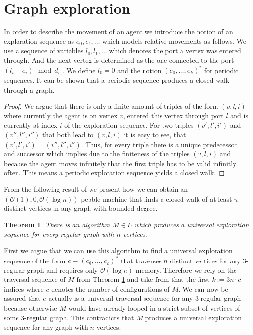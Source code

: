 \documentclass[draft,oneside]{scrartcl}
\newtheorem{thm}{Theorem}
\begin{document}
\section{Graph exploration}
In order to describe the movement of an agent we introduce the notion of an
exploration sequence as $e_{0}, e_{1},\dots$ which models relative movements
as follows. We use a sequence of variables $l_{0},l_{1},\dots$ which denotes
the port a vertex was entered through. And the next vertex is determined as the
one connected to the port $(l_{i} + e_{i}) \mod d_{v_{i}}$. We define
$l_{0} = 0$ and the notion $(e_{0},\dots,e_{k})^{\ast}$ for periodic sequences.
It can be shown that a periodic sequence produces a closed walk through a
graph.
\begin{proof}
  We argue that there is only a finite amount of triples of the
  form $(v,l,i)$ where currently the agent is on vertex $v$, entered
  this vertex through port $l$ and is currently at index $i$ of the exploration
  sequence. For two triples $(v',l',i')$ and $(v'',l'',i'')$ that both lead to
  $(v,l,i)$ it is easy to see, that $(v',l',i') = (v'',l'',i'')$. Thus, for
  every triple there is a unique predecessor and successor which implies due to
  the finiteness of the triples $(v,l,i)$ and because the agent moves
  infinitely that the first triple has to be valid infinitly often.
  This means a periodic exploration sequence yields a closed walk.
\end{proof}

From the following result of \cite{logspacealg} we present how we can obtain
an $(\mathcal{O}(1),0,\mathcal{O}(\log n))$ pebble machine that finds a closed
walk of at least $n$ distinct vertices in any graph with bounded degree.
\begin{thm}
  \label{thm:logalg}
There is an algorithm $M\in L$ which produces a universal exploration sequence
for every regular graph with $n$ vertices.
\end{thm}
First we argue that we can use this algorithm to find a universal exploration
sequence of the form $e=(e_{0},\dots,e_{k})^{\ast}$ that traverses $n$ distinct
vertices for any 3-regular graph and requires only $\mathcal{O}(\log n)$
memory. Therefore we rely on the traversal sequence of $M$ from Theorem
\ref{thm:logalg} and take from that the first $k:=3n\cdot c$ indices where
$c$ denotes the number of configurations of $M$. We can now be assured that
$e$ actually is a universal traversal sequence for any 3-regular graph because
otherwise $M$ would have already looped in a strict subset of vertices of some
3-regular graph. This contradicts that $M$ produces a universal exploration
sequence for any graph with $n$ vertices.
\end{document}
